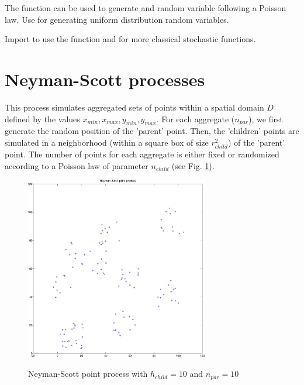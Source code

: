 \begin{mcomment}
\begin{mremark}
 The function  can be used to generate and random variable following a Poisson law. Use  for generating uniform distribution random variables.
\end{mremark}
\end{mcomment}

\begin{pcomment}
\begin{premark}
Import  to use the function  and  for more classical stochastic functions.
\end{premark}
\end{pcomment}


\section{Neyman-Scott processes}
This process simulates aggregated sets of points within a spatial domain $D$ defined by the values $x_{min}, x_{max}, y_{min}, y_{max}$. 
For each aggregate ($n_{par}$), we first generate the random position of the 'parent' point. Then, the 'children' points are simulated in a 
neighborhood (within a square box of size $r_{child}^2$) of the 'parent' point. The number of points for each aggregate is either fixed or 
randomized according to a Poisson law of parameter $n_{child}$ (see Fig. \ref{fig:point_process_generation:neymanscott}).

\begin{figure}[htbp]
 \centering\caption{Neyman-Scott point process with $h_{child}=10$ and $n_{par}=10$}%
 \includegraphics[width=8cm]{../matlab/neymanscottprocess}%
 \label{fig:point_process_generation:neymanscott}%
\end{figure}

